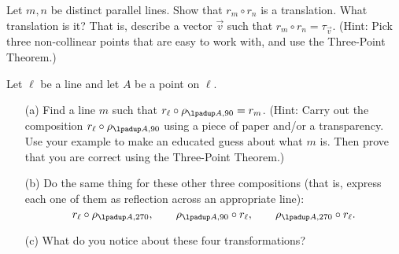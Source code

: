 \bigskip

\begin{TG}
Let $m,n$ be distinct parallel lines. Show that $r_m\circ r_n$ is a
translation. What translation is it?  That is, describe a vector
$\vec{v}$ such that $r_m\circ r_n=\tau_{\vec{v}}$.
(Hint: Pick three non-collinear points that are easy to work with,
and use the Three-Point Theorem.)
\end{TG}


\bigskip

\begin{TG} \label{ref-rot-commute}
Let $\ell$ be a line and let $A$ be a point on $\ell$.

\begin{itemize}
\item[(a)] Find a line $m$ such that $r_\ell\circ\rho_{\lpadup A,90}=r_m$.
(Hint: Carry out the composition $r_\ell\circ\rho_{\lpadup A,90}$ using a piece of 
paper and/or a transparency.  Use your example to make an educated guess
about what $m$ is.  Then prove that you are correct using the
Three-Point Theorem.)

\item[(b)] Do the same thing for these other three compositions (that
is, express each one of them as reflection across an appropriate line):
  $$r_\ell\circ\rho_{\lpadup A,270}, \qquad \rho_{\lpadup A,90}\circ r_\ell, \qquad \rho_{\lpadup A,270}\circ r_\ell.$$


\item[(c)] What do you notice about these four transformations?


\end{itemize}
\end{TG}

\bigskip

